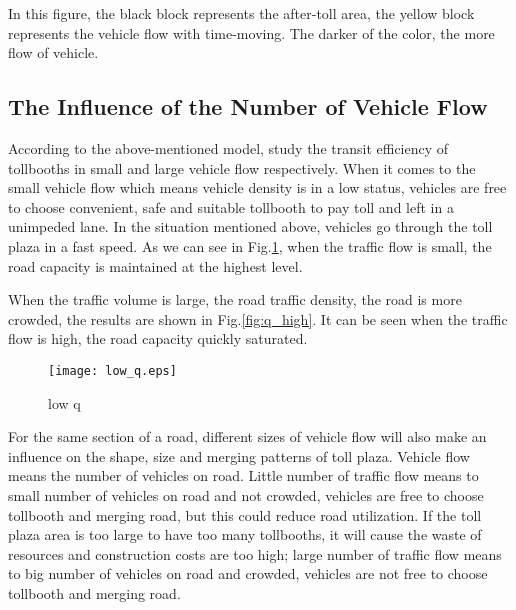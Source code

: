 \documentclass{mcmthesis}
\begin{document}
In this figure, the black block represents the after-toll area, the yellow block represents the vehicle flow with time-moving. The darker of the color, the more flow of vehicle.
\subsection{The Influence of the Number of Vehicle Flow}
According to the above-mentioned model, study the transit efficiency of tollbooths in small and large vehicle flow respectively. When it comes to the small vehicle flow which means vehicle density is in a low status, vehicles are free to choose convenient, safe and suitable tollbooth to pay toll and left in a unimpeded lane. In the situation mentioned above, vehicles go through the toll plaza in a fast speed. As we can see in Fig.\ref{fig:q_low}, when the traffic flow is small, the road capacity is maintained at the highest level.

When the traffic volume is large, the road traffic density, the road is more crowded, the results are shown in Fig.\ref{fig:q_high}. It can be seen when the traffic flow is high, the road capacity quickly saturated.
\begin{figure}[!htbp]
	\small
	\centering
	\texttt{[image: low\_q.eps]}
	\caption{\label{fig:q_low}low q} 
\end{figure}

For the same section of a road, different sizes of vehicle flow will also make an influence on the shape, size and merging patterns of toll plaza. Vehicle flow means the number of vehicles on road. Little number of traffic flow means to small number of vehicles on road and not crowded, vehicles are free to choose tollbooth and merging road, but this could reduce road utilization. If the toll plaza area is too large to have too many tollbooths, it will cause the waste of resources and construction costs are too high; large number of traffic flow means to big number of vehicles on road and crowded, vehicles are not free to choose tollbooth and merging road.
\end{document}
